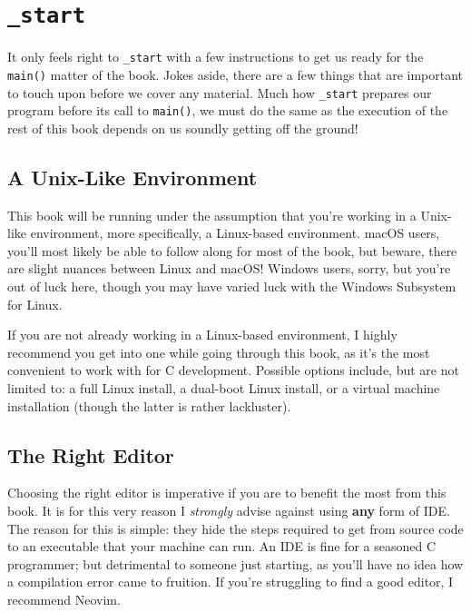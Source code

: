 %

\chapter{\texttt{\_start}}

It only feels right to \texttt{_start} with a few instructions to
get us ready for the \texttt{main()} matter of the book.  Jokes
aside, there are a few things that are important to touch upon before we
cover any material.  Much how \texttt{_start} prepares our
program before its call to \texttt{main()}, we must do the same
as the execution of the rest of this book depends on us soundly getting
off the ground!

\section{A Unix-Like Environment}

This book will be running under the assumption that you're working in a
Unix-like environment, more specifically, a Linux-based environment.
macOS users, you'll most likely be able to follow along for most of the
book, but beware, there are slight nuances between Linux and macOS!
Windows users, sorry, but you're out of luck here, though you may have
varied luck with the Windows Subsystem for Linux.

If you are not already working in a Linux-based environment, I highly
recommend you get into one while going through this book, as it's the
most convenient to work with for C development.  Possible options
include, but are not limited to: a full Linux install, a dual-boot Linux
install, or a virtual machine installation (though the latter is rather
lackluster).

\section{The Right Editor}

Choosing the right editor is imperative if you are to benefit the most
from this book.  It is for this very reason I \emph{strongly} advise
against using \textbf{any} form of IDE.  The reason for this is simple:
they hide the steps required to get from source code to an executable
that your machine can run.  An IDE is fine for a seasoned C programmer;
but detrimental to someone just starting, as you'll have no idea how a
compilation error came to fruition. If you're struggling to find a good
editor, I recommend Neovim.

